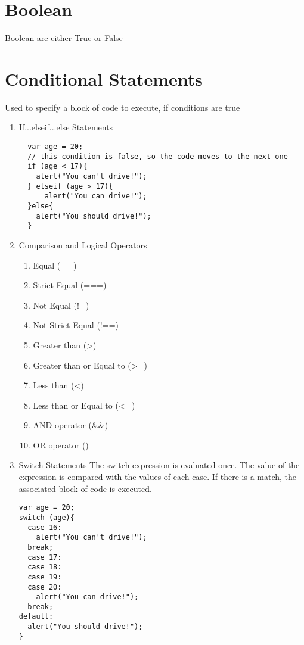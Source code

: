 \documentclass{article}
\begin{document}
\section{Boolean}
Boolean are either True or False
\section{Conditional Statements}
Used to specify a block of code to execute, if conditions are true
\begin{enumerate}
\item If...elseif...else Statements
\begin{lstlisting}
  var age = 20;
  // this condition is false, so the code moves to the next one
  if (age < 17){
    alert("You can't drive!");
  } elseif (age > 17){
      alert("You can drive!");
  }else{
    alert("You should drive!");
  }
\end{lstlisting}
\item Comparison and Logical Operators
\begin{enumerate}
\item Equal (==)
\item Strict Equal (===)
\item Not Equal (!=)
\item Not Strict Equal (!==)
\item Greater than (\textgreater)
\item Greater than or Equal to (\textgreater=)
\item Less than (\textless)
\item Less than or Equal to (\textless=)
\item AND operator ({\&}{\&})
\item OR operator (\textbar\textbar)
\end{enumerate}
\item Switch Statements
The switch expression is evaluated once. The value of the expression is compared with the values of each case. If there is a match, the associated block of code is executed.
\begin{lstlisting}
var age = 20;
switch (age){
  case 16:
    alert("You can't drive!");
  break;
  case 17:
  case 18:
  case 19:
  case 20:
    alert("You can drive!");
  break;
default:
  alert("You should drive!");
}
\end{lstlisting}
\end{enumerate}
\end{document}
